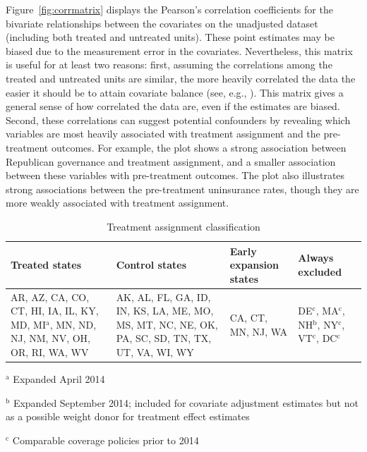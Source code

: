 Figure~\ref{fig:corrmatrix} displays the Pearson's correlation coefficients for the bivariate relationships between the covariates on the unadjusted dataset (including both treated and untreated units). These point estimates may be biased due to the measurement error in the covariates. Nevertheless, this matrix is useful for at least two reasons: first, assuming the correlations among the treated and untreated units are similar, the more heavily correlated the data the easier it should be to attain covariate balance (see, e.g., \citet{d2021overlap}). This matrix gives a general sense of how correlated the data are, even if the estimates are biased. Second, these correlations can suggest potential confounders by revealing which variables are most heavily associated with treatment assignment and the pre-treatment outcomes. For example, the plot shows a strong association between Republican governance and treatment assignment, and a smaller association between these variables with pre-treatment outcomes. The plot also illustrates strong associations between the pre-treatment uninsurance rates, though they are more weakly associated with treatment assignment. 

\begin{table}[h!]\caption{Treatment assignment classification}\label{tab:txassign}
\centering
\begin{tabularx}{\textwidth}{XXXX} \\ 
Treated states & Control states & Early expansion states & Always excluded \\ 
\hline
AR, AZ, CA, CO, CT, HI, IA, IL, KY, MD, MI$^\textrm{a}$, MN, ND, NJ, NM, NV, OH, OR, RI, WA, WV & AK, AL, FL, GA, ID, IN, KS, LA, ME, MO, MS, MT, NC, NE, OK, PA, SC, SD, TN, TX, UT, VA, WI, WY & CA, CT, MN, NJ, WA & DE$^\textrm{c}$, MA$^\textrm{c}$, NH$^\textrm{b}$, NY$^\textrm{c}$, VT$^\textrm{c}$, DC$^\textrm{c}$\\ 
\hline 
\end{tabularx} {
     \vspace{1ex} }
     {\par \raggedright $^\textrm{a}$ Expanded April 2014 \par 
     \raggedright $^\textrm{b}$ Expanded September 2014; included for covariate adjustment estimates but not as a possible weight donor for treatment effect estimates \par 
    \raggedright $^\textrm{c}$ Comparable coverage policies prior to 2014 
    \par}
\end{table}


